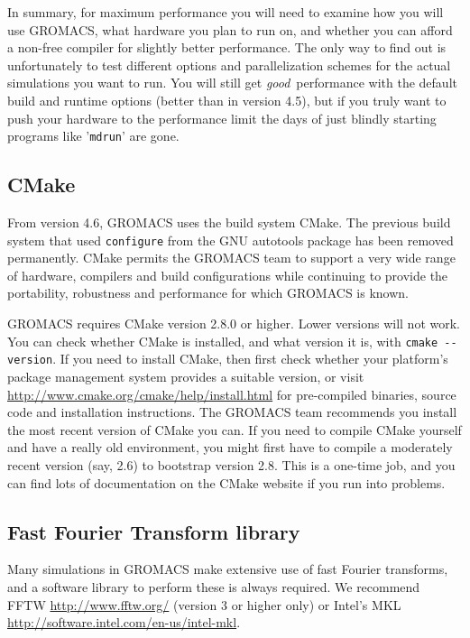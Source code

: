 \documentclass{article}[12pt,a4paper,twoside]
\newcommand{\gromacs}{GROMACS}
\newcommand{\fftw}{FFTW}
\newcommand{\mkl}{MKL}
\newcommand{\cmake}{CMake}
\newcommand{\cmakeversion}{2.8.0}
\begin{document}
In summary, for maximum performance you will need to 
examine how you will use \gromacs{}, what hardware you plan to run
on, and whether you can afford a non-free compiler for slightly better
performance. The only way to find out is unfortunately to test different
options and parallelization schemes for the actual simulations you
want to run. You will still get {\em good}\, performance with the default
build and runtime options (better than in version 4.5), but if you truly
want to push your hardware to the performance limit the days of just blindly 
starting programs like '\verb+mdrun+' are gone. 

\subsection{CMake}

From version 4.6, \gromacs{} uses the build system
\cmake{}. The previous build system that used \verb+configure+ from
the GNU autotools package has been removed permanently. \cmake{}
permits the \gromacs{} team to support a very wide range of hardware,
compilers and build configurations while continuing to provide the
portability, robustness and performance for which \gromacs{} is known.

\gromacs{} requires \cmake{} version \cmakeversion{} or higher. Lower
versions will not work. You can check whether \cmake{} is installed,
and what version it is, with \verb+cmake --version+. If you need to
install \cmake{}, then first check whether your platform's package
management system provides a suitable version, or visit
\url{http://www.cmake.org/cmake/help/install.html} for pre-compiled
binaries, source code and installation instructions. The \gromacs{}
team recommends you install the most recent version of \cmake{} you
can. If you need to compile \cmake{} yourself and have a really old environment,
you might first have to compile a moderately recent version (say, 2.6) to
bootstrap version 2.8. This is a one-time job, and you can find lots of
documentation on the \cmake{} website if you run into problems.

\subsection{Fast Fourier Transform library}

Many simulations in \gromacs{} make extensive use of fast Fourier transforms,
and a software library to perform these is always required. We
recommend \fftw{} \url{http://www.fftw.org/} (version 3 or higher
only) or Intel's \mkl{} \url{http://software.intel.com/en-us/intel-mkl}. 
\end{document}

